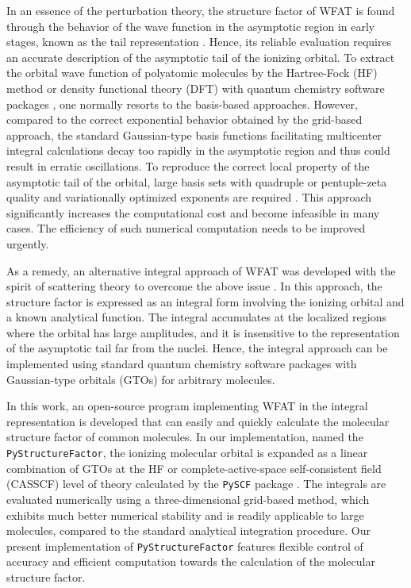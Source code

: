 \documentclass[preprint,12pt]{elsarticle} %
\begin{document}
In an essence of the perturbation theory, the structure factor of WFAT is found through the behavior of the wave function in the asymptotic region in early stages, known as the tail representation \cite{madsen_structure_2013, trinh_weak-field_2015, madsen_application_2014}. Hence, its reliable evaluation requires an accurate description of the asymptotic tail of the ionizing orbital. To extract the orbital wave function of polyatomic molecules by the Hartree-Fock (HF) method or density functional theory (DFT) with quantum chemistry software packages \cite{madsen_application_2014, saito_structure_2015}, one normally resorts to the basis-based approaches. However, compared to the correct exponential behavior obtained by the grid-based approach, the standard Gaussian-type basis functions facilitating multicenter integral calculations decay too rapidly in the asymptotic region and thus could result in erratic oscillations. To reproduce the correct local property of the asymptotic tail of the orbital, large basis sets with quadruple or pentuple-zeta quality and variationally optimized exponents are required \cite{trinh_first-order_2013}. This approach significantly increases the computational cost and become infeasible in many cases. The efficiency of such numerical computation needs to be improved urgently.

As a remedy, an alternative integral approach of WFAT was developed with the spirit of scattering theory to overcome the above issue \cite{madsen_structure_2017, dnestryan_structure_2018, samygin_weak-field_2018}. In this approach, the structure factor is expressed as an integral form involving the ionizing orbital and a known analytical function. The integral accumulates at the localized regions where the orbital has large amplitudes, and it is insensitive to the representation of the asymptotic tail far from the nuclei. Hence, the integral approach can be implemented using standard quantum chemistry software packages with Gaussian-type orbitals (GTOs) for arbitrary molecules.

In this work, an open-source program implementing WFAT in the integral representation is developed that can easily and quickly calculate the molecular structure factor of common molecules. In our implementation, named the \texttt{PyStructureFactor}, the ionizing molecular orbital is expanded as a linear combination of GTOs at the HF or complete-active-space self-consistent field (CASSCF) level of theory calculated by the \texttt{PySCF} package \cite{sun_pyscf_2018, sun_recent_2020}. The integrals are evaluated numerically using a three-dimensional grid-based method, which exhibits much better numerical stability and is readily applicable to large molecules, compared to the standard analytical integration procedure. Our present implementation of \texttt{PyStructureFactor} features flexible control of accuracy and efficient computation towards the calculation of the molecular structure factor.
\end{document}
